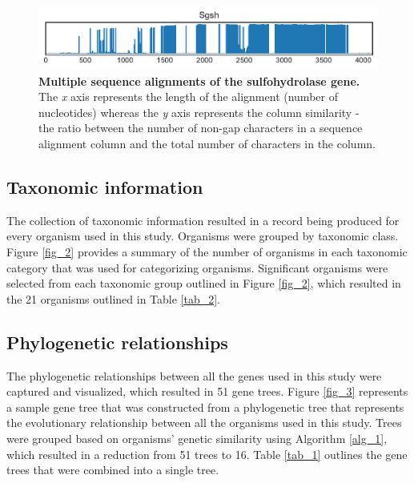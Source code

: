 \documentclass{article}
\begin{document}
\begin{figure}
\centering
\includegraphics[width=\textwidth]{./images/sulfohydrolase_msa.pdf}
\caption{\textbf{Multiple sequence alignments of the sulfohydrolase gene.} The \textit{x} axis represents the length of the alignment (number of nucleotides) whereas the \textit{y} axis represents the column similarity - the ratio between the number of non-gap characters in a sequence alignment column and the total number of characters in the column.}
\label{msa_fig_11}
\end{figure}

\subsection{Taxonomic information}
The collection of taxonomic information resulted in a record being produced for every organism used in this study. Organisms were grouped by taxonomic class. Figure \ref{fig_2} provides a summary of the number of organisms in each taxonomic category that was used for categorizing organisms. Significant organisms were selected from each taxonomic group outlined in Figure \ref{fig_2}, which resulted in the 21 organisms outlined in Table \ref{tab_2}.

\subsection{Phylogenetic relationships}
The phylogenetic relationships between all the genes used in this study were captured and visualized, which resulted in 51 gene trees. Figure \ref{fig_3} represents a sample gene tree that was constructed from a phylogenetic tree that represents the evolutionary relationship between all the organisms used in this study. Trees were grouped based on organisms' genetic similarity using Algorithm \ref{alg_1}, which resulted in a reduction from 51 trees to 16. Table \ref{tab_1} outlines the gene trees that were combined into a single tree.
\end{document}
